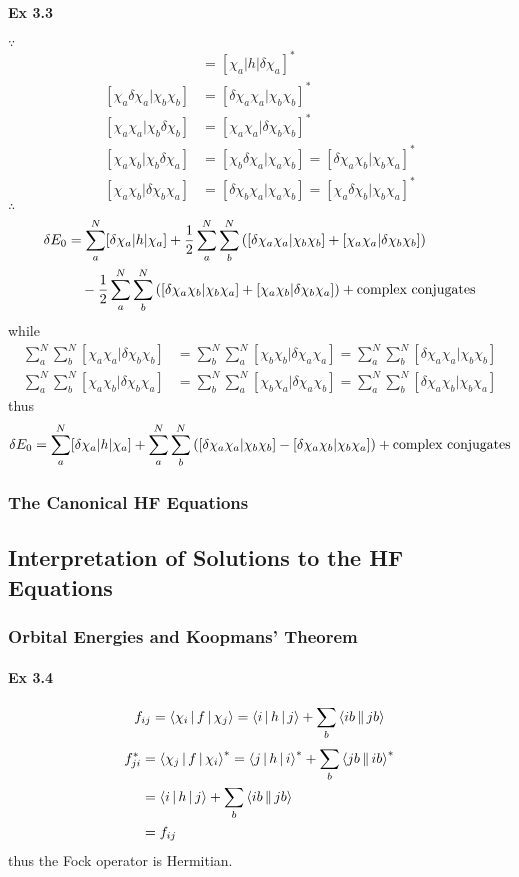 \documentclass[a4paper]{article}
\newcommand{\ex}[1]{\paragraph{Ex #1}}
\numberwithin{equation}{subsection}
\begin{document}
\ex{3.3}
$ \because $
\begin{align}
[\delta\chi_a | h | \chi_a] &= [\chi_a | h | \delta\chi_a]^*\\
[\chi_a\delta\chi_a | \chi_b\chi_b] &= [\delta\chi_a\chi_a | \chi_b\chi_b]^*\\
[\chi_a\chi_a | \chi_b\delta\chi_b] &= [\chi_a\chi_a | \delta\chi_b\chi_b]^*\\
[\chi_a\chi_b | \chi_b\delta\chi_a] &= [\chi_b\delta\chi_a | \chi_a\chi_b] = [\delta\chi_a\chi_b | \chi_b\chi_a]^*\\
[\chi_a\chi_b | \delta\chi_b\chi_a] &= [\delta\chi_b\chi_a | \chi_a\chi_b] = [\chi_a\delta\chi_b | \chi_b\chi_a]^*
\end{align}
$ \therefore $
\begin{align}
\delta E_0 &= \sum_a^N[\delta\chi_a | h | \chi_a] 
+ \dfrac{1}{2}\sum_a^N\sum_b^N \qty([\delta\chi_a\chi_a | \chi_b\chi_b] + [\chi_a\chi_a | \delta\chi_b\chi_b]) \notag\\
&\quad{} - \dfrac{1}{2}\sum_a^N\sum_b^N \qty([\delta\chi_a\chi_b | \chi_b\chi_a] + [\chi_a\chi_b | \delta\chi_b\chi_a]) + \text{complex conjugates}
\end{align}
while
\begin{align}
\sum_a^N\sum_b^N [\chi_a\chi_a | \delta\chi_b\chi_b] &= \sum_b^N\sum_a^N [\chi_b\chi_b | \delta\chi_a\chi_a] = \sum_a^N\sum_b^N [\delta\chi_a\chi_a | \chi_b\chi_b]\\
\sum_a^N\sum_b^N [\chi_a\chi_b | \delta\chi_b\chi_a] &= \sum_b^N\sum_a^N [\chi_b\chi_a | \delta\chi_a\chi_b] = \sum_a^N\sum_b^N [\delta\chi_a\chi_b | \chi_b\chi_a]
\end{align}
thus
\begin{equation}\label{key}
\delta E_0 = \sum_a^N[\delta\chi_a | h | \chi_a] 
+ \sum_a^N\sum_b^N \qty([\delta\chi_a\chi_a | \chi_b\chi_b] - [\delta\chi_a\chi_b | \chi_b\chi_a]) + \text{complex conjugates}
\end{equation}

\subsubsection{The Canonical HF Equations}

\subsection{Interpretation of Solutions to the HF Equations}
\subsubsection{Orbital Energies and Koopmans' Theorem}
\ex{3.4}
\begin{align}
f_{ij} = \Braket{\chi_i | f | \chi_j} = \Braket{i|h|j} + \sum_b\Braket{ib||jb}
\end{align}
\begin{align}
f_{ji}^* &= \Braket{\chi_j | f | \chi_i}^* = \Braket{j|h|i}^* + \sum_b\Braket{jb||ib}^*\notag\\
&= \Braket{i|h|j} + \sum_b\Braket{ib||jb}\notag\\
&= f_{ij}
\end{align}
thus the Fock operator is Hermitian.
\end{document}
